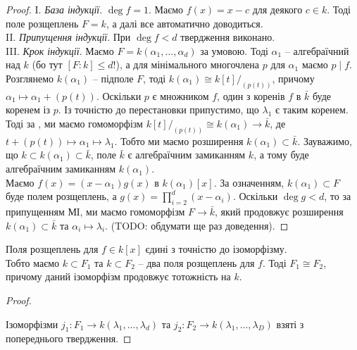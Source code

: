 \documentclass{math_library}
\begin{document}
\begin{proof}
I. \textit{База індукції}. $\deg f = 1$. Маємо $f(x) = x - c$ для деякого $c \in k$. Тоді поле розщеплень $F = k$, а далі все автоматично доводиться.\\
II. \textit{Припущення індукції}. При $\deg f < d$ твердження виконано.
\bigskip \\
III. \textit{Крок індукції}. Маємо $F = k(\alpha_1,\dots,\alpha_d)$ за умовою. Тоді $\alpha_1$ -- алгебраїчний над $k$ (бо тут $[F:k] \leq d!$), а для мінімального многочлена $p$ для $\alpha_1$ маємо $p \mid f$. Розглянемо $k(\alpha_1)$ -- підполе $F$, тоді $k(\alpha_1) \cong k[t]/_{(p(t))}$, причому $\alpha_1 \mapsto \alpha_1 + (p(t))$. Оскільки $p$ є множником $f$, один з коренів $f$ в $\bar{k}$ буде коренем із $p$. Із точністю до перестановки припустимо, що $\lambda_1$ є таким коренем. Тоді за , ми маємо гомоморфізм $k[t]/_{(p(t))} \cong k(\alpha_1) \to \bar{k}$, де $t + (p(t)) \mapsto \alpha_1 \mapsto \lambda_1$. Тобто ми маємо розширення $k(\alpha_1) \subset \bar{k}$. Зауважимо, що $k \subset k(\alpha_1) \subset \bar{k}$, поле $\bar{k}$ є алгебраїчним замиканням $k$, а тому буде алгебраїчним замиканням $k(\alpha_1)$.\\
Маємо $f(x) = (x-\alpha_1) g(x)$ в $k(\alpha_1)[x]$. За означенням, $k(\alpha_1) \subset F$ буде полем розщеплень, а $g(x) = \displaystyle\prod_{i=2}^d (x-\alpha_i)$. Оскільки $\deg g < d$, то за припущенням МІ, ми маємо гомоморфізм $F \to \bar{k}$, який продовжує розширення $k(\alpha_1) \subset \bar{k}$ та $\alpha_i \mapsto \lambda_i$. (TODO: обдумати ще раз доведення).
\end{proof}

\begin{corollary}
\label{splitting_fields_unique_up_to_isomorphism}
Поля розщеплень для $f \in k[x]$ єдині з точністю до ізоморфізму. \\
Тобто маємо $k \subset F_1$ та $k \subset F_2$ -- два поля розщеплень для $f$. Тоді $F_1 \cong F_2$, причому даний ізоморфізм продовжує тотожність на $k$.
\end{corollary}


\begin{proof}
\begin{figure}[H]
\centering
{}
\end{figure}
Ізоморфізми $j_1 \colon F_1 \to k(\lambda_1,\dots,\lambda_d)$ та $j_2 \colon F_2 \to k(\lambda_1,\dots,\lambda_D)$ взяті з попереднього твердження.
\end{proof}
\end{document}

